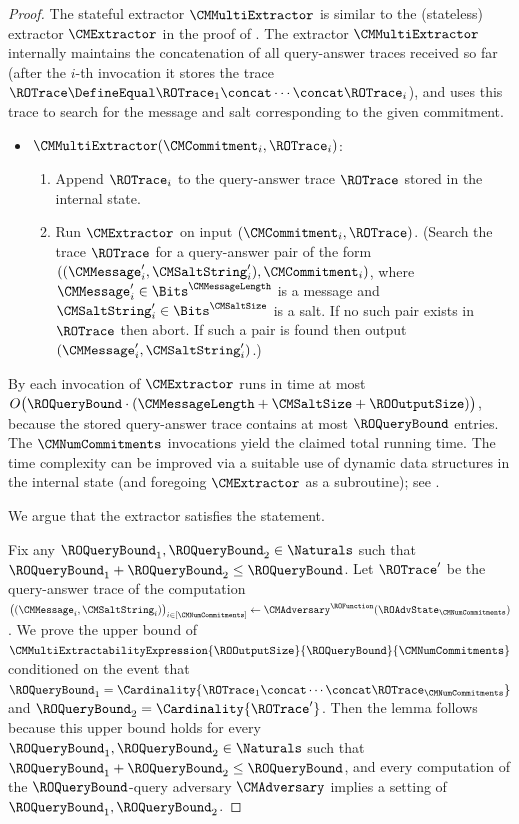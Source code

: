 \begin{proof}
The stateful extractor $\CMMultiExtractor$ is similar to the (stateless) extractor $\CMExtractor$ in the proof of . The extractor $\CMMultiExtractor$ internally maintains the concatenation of all query-answer traces received so far (after the $i$-th invocation it stores the trace $\ROTrace \DefineEqual \ROTrace_{1} \concat \cdots \concat \ROTrace_{i}$), and uses this trace to search for the message and salt corresponding to the given commitment.
\begin{itemize}

  \item[] $\CMMultiExtractor(\CMCommitment_{i},\ROTrace_{i})$:
  \begin{enumerate}[nolistsep]
    \item Append $\ROTrace_{i}$ to the query-answer trace $\ROTrace$ stored in the internal state.
    \item Run $\CMExtractor$ on input $(\CMCommitment_{i},\ROTrace)$. (Search the trace $\ROTrace$ for a query-answer pair of the form $((\CMMessage'_{i},\CMSaltString'_{i}),\CMCommitment_{i})$, where $\CMMessage'_{i} \in \Bits^{\CMMessageLength}$ is a message and $\CMSaltString'_{i} \in \Bits^{\CMSaltSize}$ is a salt. If no such pair exists in $\ROTrace$ then abort. If such a pair is found then output $(\CMMessage'_{i},\CMSaltString'_{i})$.)
  \end{enumerate}
\end{itemize}
By  each invocation of $\CMExtractor$ runs in time at most $O\big(\ROQueryBound \cdot (\CMMessageLength + \CMSaltSize + \ROOutputSize) \big)$, because the stored query-answer trace contains at most $\ROQueryBound$ entries. The $\CMNumCommitments$ invocations yield the claimed total running time. The time complexity can be improved via a suitable use of dynamic data structures in the internal state (and foregoing $\CMExtractor$ as a subroutine); see .

We argue that the extractor satisfies the statement.

Fix any $\ROQueryBound_{1},\ROQueryBound_{2} \in \Naturals$ such that $\ROQueryBound_{1} + \ROQueryBound_{2} \leq \ROQueryBound$. Let $\ROTrace'$ be the query-answer trace of the computation $\big((\CMMessage_{i},\CMSaltString_{i})\big)_{i \in [\CMNumCommitments]} \gets \CMAdversary^{\ROFunction}(\ROAdvState_{\CMNumCommitments})$. We prove the upper bound of $\CMMultiExtractabilityExpression{\ROOutputSize}{\ROQueryBound}{\CMNumCommitments}$ conditioned on the event that $\ROQueryBound_{1} = \Cardinality{\ROTrace_{1} \concat \cdots \concat \ROTrace_{\CMNumCommitments}}$ and $\ROQueryBound_{2} = \Cardinality{\ROTrace'}$. Then the lemma follows because this upper bound holds for every $\ROQueryBound_{1},\ROQueryBound_{2} \in \Naturals$ such that $\ROQueryBound_{1} + \ROQueryBound_{2} \leq \ROQueryBound$, and every computation of the $\ROQueryBound$-query adversary $\CMAdversary$ implies a setting of $\ROQueryBound_{1},\ROQueryBound_{2}$.


\end{proof}
